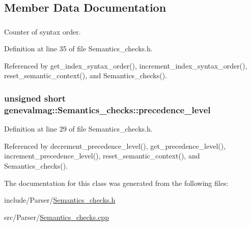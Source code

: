 \subsection{Member Data Documentation}
\hypertarget{classgenevalmag_1_1Semantics__checks_a7dcdb23df315da76ae288462e3427591}{
\subsubsection[{index\_\-syntax\_\-order}]{}}
\label{classgenevalmag_1_1Semantics__checks_a7dcdb23df315da76ae288462e3427591}


Counter of syntax order. 



Definition at line 35 of file Semantics\_\-checks.h.



Referenced by get\_\-index\_\-syntax\_\-order(), increment\_\-index\_\-syntax\_\-order(), reset\_\-semantic\_\-context(), and Semantics\_\-checks().

\hypertarget{classgenevalmag_1_1Semantics__checks_ae69cd5c1a7b7d2cfa05c370617a8d58f}{
\subsubsection[{precedence\_\-level}]{\setlength{\rightskip}{0pt plus 5cm}unsigned short {\bf genevalmag::Semantics\_\-checks::precedence\_\-level}}}
\label{classgenevalmag_1_1Semantics__checks_ae69cd5c1a7b7d2cfa05c370617a8d58f}


Definition at line 29 of file Semantics\_\-checks.h.



Referenced by decrement\_\-precedence\_\-level(), get\_\-precedence\_\-level(), increment\_\-precedence\_\-level(), reset\_\-semantic\_\-context(), and Semantics\_\-checks().



The documentation for this class was generated from the following files:\begin{DoxyCompactItemize}
\item 
include/Parser/\hyperlink{Semantics__checks_8h}{Semantics\_\-checks.h}\item 
src/Parser/\hyperlink{Semantics__checks_8cpp}{Semantics\_\-checks.cpp}\end{DoxyCompactItemize}
